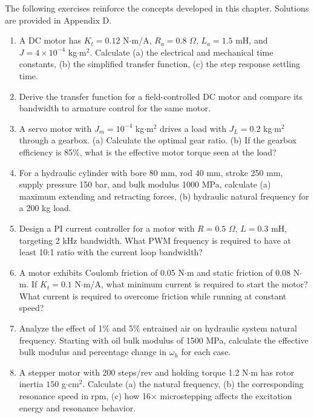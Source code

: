 The following exercises reinforce the concepts developed in this chapter. Solutions are provided in Appendix D.

\begin{enumerate}
    \item A DC motor has $K_t = 0.12$ N$\cdot$m/A, $R_a = 0.8$ $\Omega$, $L_a = 1.5$ mH, and $J = 4 \times 10^{-4}$ kg$\cdot$m$^2$. Calculate (a) the electrical and mechanical time constants, (b) the simplified transfer function, (c) the step response settling time.

    \item Derive the transfer function for a field-controlled DC motor and compare its bandwidth to armature control for the same motor.

    \item A servo motor with $J_m = 10^{-4}$ kg$\cdot$m$^2$ drives a load with $J_L = 0.2$ kg$\cdot$m$^2$ through a gearbox. (a) Calculate the optimal gear ratio. (b) If the gearbox efficiency is 85\%, what is the effective motor torque seen at the load?

    \item For a hydraulic cylinder with bore 80 mm, rod 40 mm, stroke 250 mm, supply pressure 150 bar, and bulk modulus 1000 MPa, calculate (a) maximum extending and retracting forces, (b) hydraulic natural frequency for a 200 kg load.

    \item Design a PI current controller for a motor with $R = 0.5$ $\Omega$, $L = 0.3$ mH, targeting 2 kHz bandwidth. What PWM frequency is required to have at least 10:1 ratio with the current loop bandwidth?

    \item A motor exhibits Coulomb friction of 0.05 N$\cdot$m and static friction of 0.08 N$\cdot$m. If $K_t = 0.1$ N$\cdot$m/A, what minimum current is required to start the motor? What current is required to overcome friction while running at constant speed?

    \item Analyze the effect of 1\% and 5\% entrained air on hydraulic system natural frequency. Starting with oil bulk modulus of 1500 MPa, calculate the effective bulk modulus and percentage change in $\omega_h$ for each case.

    \item A stepper motor with 200 steps/rev and holding torque 1.2 N$\cdot$m has rotor inertia $150$ g$\cdot$cm$^2$. Calculate (a) the natural frequency, (b) the corresponding resonance speed in rpm, (c) how 16$\times$ microstepping affects the excitation energy and resonance behavior.
\end{enumerate}

